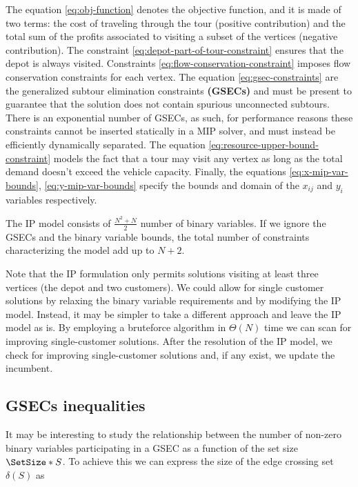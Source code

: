 The equation \eqref{eq:obj-function} denotes the objective function, and it is made of two terms: the cost of traveling through the tour (positive contribution) and the total sum of the profits associated to visiting a subset of the vertices (negative contribution).
The constraint \eqref{eq:depot-part-of-tour-constraint} ensures that the depot is always visited.
Constraints \eqref{eq:flow-conservation-constraint} imposes flow conservation constraints for each vertex.
The equation \eqref{eq:gsec-constraints} are the generalized subtour elimination constraints \textbf{(GSECs)} and must be present to guarantee that the solution does not contain spurious unconnected subtours.
There is an exponential number of GSECs, as such, for performance reasons these constraints cannot be inserted statically in a MIP solver, and must instead be efficiently dynamically separated.
The equation \eqref{eq:resource-upper-bound-constraint} models the fact that a tour may visit any vertex as long as the total demand doesn't exceed the vehicle capacity.
Finally, the equations \eqref{eq:x-mip-var-bounds}, \eqref{eq:y-mip-var-bounds} specify the bounds and domain of the $x_{ij}$ and $y_{i}$ variables respectively.

The IP model consists of $\frac{N^2 + N}{2}$ number of binary variables.
If we ignore the GSECs and the binary variable bounds, the total number of constraints characterizing the model add up to $N + 2$.

Note that the IP formulation only permits solutions visiting at least three vertices (the depot and two customers).
We could allow for single customer solutions by relaxing the binary variable requirements and by modifying the IP model.
Instead, it may be simpler to take a different approach and leave the IP model as is.
By employing a bruteforce algorithm in $\Theta(N)$ time we can scan for improving single-customer solutions.
After the resolution of the IP model, we check for improving single-customer solutions and, if any exist, we update the incumbent.

\subsection{GSECs inequalities}\label{sec:gsec-inequality}


It may be interesting to study the relationship between the number of non-zero binary variables participating in a GSEC as a function of the set size $\SetSize*{S}$.
To achieve this we can express the size of the edge crossing set $\delta(S)$ as

